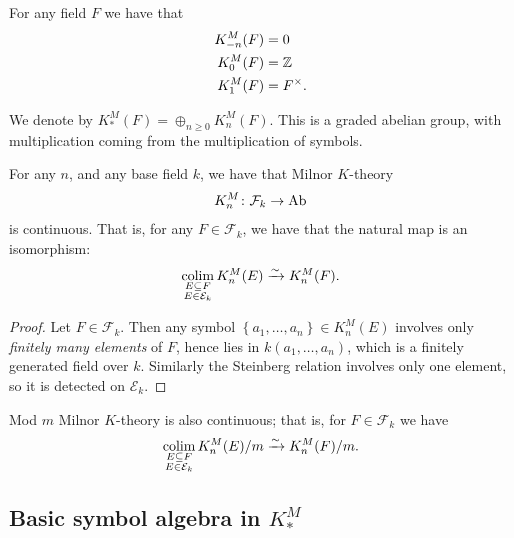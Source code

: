 \documentclass[11pt,openany]{book}
\begin{document}
\begin{proposition} For any field $F$ we have that
\begin{align*}
    K^M_{-n}(F) &= 0 \\
    K^M_0(F) &= \mathbb{Z} \\
    K^M_{1}(F) &= F^\times.
\end{align*}
\end{proposition}

\begin{notation} We denote by $K_\ast^M(F) = \oplus_{n\ge0} K_n^M(F)$. This is a graded abelian group, with multiplication coming from the multiplication of symbols.
\end{notation}

\begin{proposition}\label{prop:Milnor-K-thy-continuous} 
For any $n$, and any base field $k$, we have that Milnor $K$-theory
\begin{align*}
    K_n^M \colon \mathcal{F}_k \to \mathrm{Ab}
\end{align*}
is continuous. That is, for any $F\in \mathcal{F}_k$, we have that the natural map is an isomorphism:
\begin{align*}
   \mathop{\mathrm{colim}}_{\substack{E \subseteq F \\ E \in \mathcal{E}_k}} K_n^M(E) \xrightarrow{\sim} K_n^M(F).
\end{align*}
\end{proposition}
\begin{proof} Let $F\in \mathcal{F}_k$. Then any symbol $\left\{ a_1, \ldots, a_n \right\}\in K_n^M(E)$ involves only \emph{finitely many elements} of $F$, hence lies in $k(a_1, \ldots, a_n)$, which is a finitely generated field over $k$. Similarly the Steinberg relation involves only one element, so it is detected on $\mathcal{E}_k$.
\end{proof}

\begin{corollary} Mod $m$ Milnor $K$-theory is also continuous; that is, for $F\in \mathcal{F}_k$ we have
\begin{align*}
   \mathop{\mathrm{colim}}_{\substack{E \subseteq F \\ E \in \mathcal{E}_k}} K_n^M(E)/m \xrightarrow{\sim} K_n^M(F)/m.
\end{align*}
\end{corollary}



\subsection{Basic symbol algebra in $K_\ast^M$}
\end{document}
